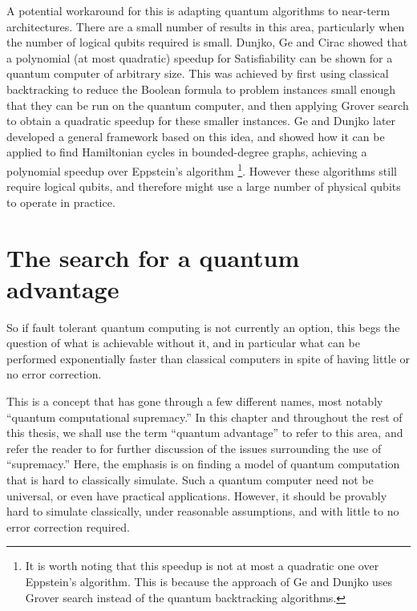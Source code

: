 A potential workaround for this is adapting quantum algorithms to near-term architectures. There are a small number of results in this area, particularly when the number of logical qubits required is small. Dunjko, Ge and Cirac \cite{dunjko2018} showed that a polynomial (at most quadratic) speedup for Satisfiability can be shown for a quantum computer of arbitrary size. This was achieved by first using classical backtracking to reduce the Boolean formula to problem instances small enough that they can be run on the quantum computer, and then applying Grover search to obtain a quadratic speedup for these smaller instances. Ge and Dunjko \cite{ge2019} later developed a general framework based on this idea, and showed how it can be applied to find Hamiltonian cycles in bounded-degree graphs, achieving a polynomial speedup over Eppstein's algorithm \cite{eppstein2007}\footnote{It is worth noting that this speedup is not at most a quadratic one over Eppstein's algorithm. This is because the approach of Ge and Dunjko uses Grover search instead of the quantum backtracking algorithms.}. However these algorithms still require logical qubits, and therefore might use a large number of physical qubits to operate in practice.

\section{The search for a quantum advantage}

So if fault tolerant quantum computing is not currently an option, this begs the question of what is achievable without it, and in particular what can be performed exponentially faster than classical computers in spite of having little or no error correction.

This is a concept that has gone through a few different names, most notably ``quantum computational supremacy.'' In this chapter and throughout the rest of this thesis, we shall use the term ``quantum advantage'' to refer to this area, and refer the reader to \cite{wiesner2017} for further discussion of the issues surrounding the use of ``supremacy.'' Here, the emphasis is on finding a model of quantum computation that is hard to classically simulate. Such a quantum computer need not be universal, or even have practical applications. However, it should be provably hard to simulate classically, under reasonable assumptions, and with little to no error correction required.

